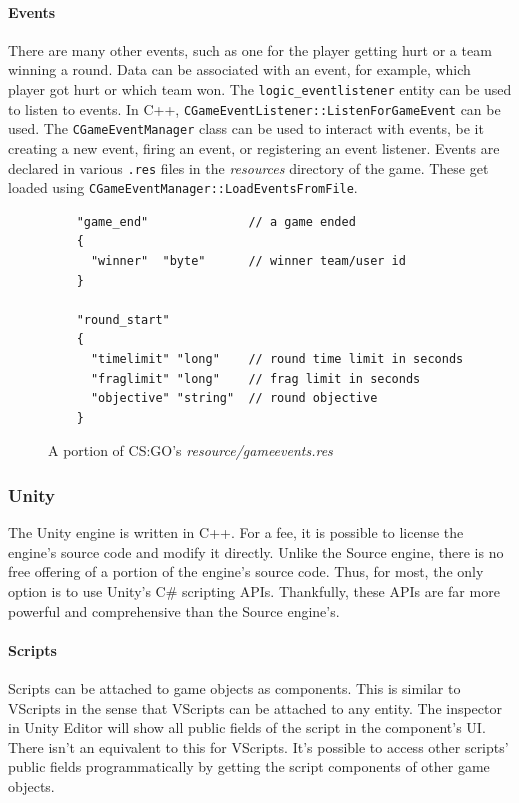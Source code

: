 \documentclass[a4paper, 12pt]{scrartcl}
\begin{document}
\paragraph{Events}
There are many other events, such as one for the player getting hurt or a team winning a round. Data can be associated with an event, for example, which player got hurt or which team won. The \texttt{logic\_eventlistener} entity can be used to listen to events. In C++, \texttt{CGameEventListener::ListenForGameEvent} can be used. The \texttt{CGameEventManager} class can be used to interact with events, be it creating a new event, firing an event, or registering an event listener. Events are declared in various \texttt{.res} files in the \textit{resources} directory of the game. These get loaded using \texttt{CGameEventManager::LoadEventsFromFile}.

\begin{figure}[!htp]
  \begin{verbatim}
    "game_end"              // a game ended
    {
      "winner"  "byte"      // winner team/user id
    }

    "round_start"
    {
      "timelimit" "long"    // round time limit in seconds
      "fraglimit" "long"    // frag limit in seconds
      "objective" "string"  // round objective
    }
  \end{verbatim}
  \caption{A portion of CS:GO's \textit{resource/gameevents.res}}
  \label{fig:source_gameevents}
\end{figure}

\subsubsection{Unity}
The Unity engine is written in C++. For a fee, it is possible to license the engine's source code and modify it directly. Unlike the Source engine, there is no free offering of a portion of the engine's source code. Thus, for most, the only option is to use Unity's C\# scripting APIs. Thankfully, these APIs are far more powerful and comprehensive than the Source engine's.

\paragraph{Scripts}
Scripts can be attached to game objects as components. This is similar to VScripts in the sense that VScripts can be attached to any entity. The inspector in Unity Editor will show all public fields of the script in the component's UI. There isn't an equivalent to this for VScripts. It's possible to access other scripts' public fields programmatically by getting the script components of other game objects.
\end{document}
